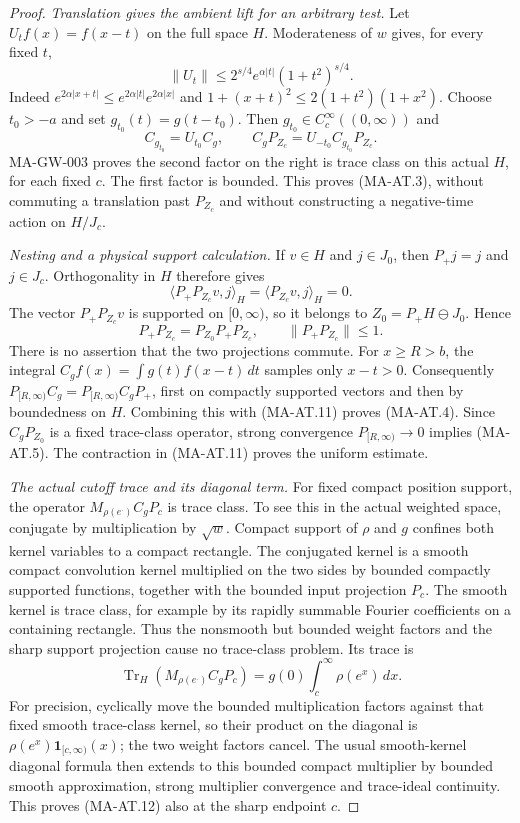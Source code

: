 \begin{proof}
\emph{Translation gives the ambient lift for an arbitrary test.}
Let \(U_t f(x)=f(x-t)\) on the full space \(H\).
Moderateness of \(w\) gives, for every fixed \(t\),
\[
 \|U_t\|\le 2^{s/4}e^{\alpha|t|}(1+t^2)^{s/4}.
 \tag{MA-AT.9}
\]
Indeed \(e^{2\alpha|x+t|}\le
e^{2\alpha|t|}e^{2\alpha|x|}\) and
\(1+(x+t)^2\le2(1+t^2)(1+x^2)\).
Choose \(t_0>-a\) and set \(g_{t_0}(t)=g(t-t_0)\).
Then \(g_{t_0}\in C_c^\infty((0,\infty))\) and
\[
 C_{g_{t_0}}=U_{t_0}C_g,\qquad
 C_gP_{Z_c}=U_{-t_0}C_{g_{t_0}}P_{Z_c}.
 \tag{MA-AT.10}
\]
MA-GW-003 proves the second factor on the right is trace class
on this actual \(H\), for each fixed \(c\).
The first factor is bounded.  This proves (MA-AT.3), without
commuting a translation past \(P_{Z_c}\) and without constructing
a negative-time action on \(H/J_c\).

\emph{Nesting and a physical support calculation.}
If \(v\in H\) and \(j\in J_0\), then \(P_+j=j\) and \(j\in J_c\).
Orthogonality in \(H\) therefore gives
\[
 \langle P_+P_{Z_c}v,j\rangle_H
     =\langle P_{Z_c}v,j\rangle_H=0.
 \]
The vector \(P_+P_{Z_c}v\) is supported on \([0,\infty)\),
so it belongs to \(Z_0=P_+H\ominus J_0\).  Hence
\[
 P_+P_{Z_c}=P_{Z_0}P_+P_{Z_c},\qquad
 \|P_+P_{Z_c}\|\le1.
 \tag{MA-AT.11}
\]
There is no assertion that the two projections commute.
For \(x\ge R>b\), the integral
\(C_gf(x)=\int g(t)f(x-t)\,dt\) samples only \(x-t>0\).
Consequently \(P_{[R,\infty)}C_g
 =P_{[R,\infty)}C_gP_+\), first on compactly supported
vectors and then by boundedness on \(H\).
Combining this with (MA-AT.11) proves (MA-AT.4).
Since \(C_gP_{Z_0}\) is a fixed trace-class operator,
strong convergence \(P_{[R,\infty)}\to0\) implies (MA-AT.5).
The contraction in (MA-AT.11) proves the uniform estimate.

\emph{The actual cutoff trace and its diagonal term.}
For fixed compact position support, the operator
\(M_{\rho(e^\cdot)}C_gP_c\) is trace class.
To see this in the actual weighted space, conjugate by multiplication
by \(\sqrt w\).  Compact support of \(\rho\) and \(g\) confines both
kernel variables to a compact rectangle.  The conjugated kernel is
a smooth compact convolution kernel multiplied on the two sides by
bounded compactly supported functions, together with the bounded
input projection \(P_c\).  The smooth kernel is trace class, for
example by its rapidly summable Fourier coefficients on a containing
rectangle.  Thus the nonsmooth but bounded weight factors and the
sharp support projection cause no trace-class problem.
Its trace is
\[
 \operatorname{Tr}_H(M_{\rho(e^\cdot)}C_gP_c)
       =g(0)\int_c^\infty\rho(e^x)\,dx.
 \tag{MA-AT.12}
\]
For precision, cyclically move the bounded multiplication factors
against that fixed smooth trace-class kernel, so their product on
the diagonal is \(\rho(e^x)\mathbf1_{[c,\infty)}(x)\);
the two weight factors cancel.
The usual smooth-kernel diagonal formula then extends to this
bounded compact multiplier by bounded smooth approximation,
strong multiplier convergence and trace-ideal continuity.
This proves (MA-AT.12) also at the sharp endpoint \(c\).


\end{proof}
